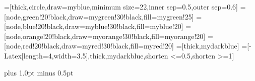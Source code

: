 \documentclass{report}
\begin{document}
\usepackage{xcolor}
=[thick,circle,draw=myblue,minimum size=22,inner sep=0.5,outer sep=0.6]
=[node,green!20!black,draw=mygreen!30!black,fill=mygreen!25]
=[node,blue!20!black,draw=myblue!30!black,fill=myblue!20]
=[node,orange!20!black,draw=myorange!30!black,fill=myorange!20]
=[node,red!20!black,draw=myred!30!black,fill=myred!20]
=[thick,mydarkblue] %
=[-{Latex[length=4,width=3.5]},thick,mydarkblue,shorten <=0.5,shorten >=1]
\def\nstyle{int(\lay<\Nnodlen?min(2,\lay):3)} %

\newlength\mybibindent
\setlength\mybibindent{0pt}
\makeatletter
\renewenvironment{thebibliography}[1]
    {\chapter*{\bibname}%
     \@mkboth{\MakeUppercase\bibname}{\MakeUppercase\bibname}%
     \list{\@biblabel{\@arabic\c@enumiv}}
          {\settowidth\labelwidth{\@biblabel{999}}
           \leftmargin\labelwidth
            \advance\leftmargin\dimexpr\labelsep+\mybibindent\relax\itemindent-\mybibindent
           \@openbib@code
           \usecounter{enumiv}
           \let\p@enumiv\@empty
           \renewcommand\theenumiv{\@arabic\c@enumiv}}
     \sloppy
     \clubpenalty4000
     \@clubpenalty \clubpenalty
     \widowpenalty4000%
     \sfcode`\.\@m}
    {\def\@noitemerr
      {\@latex@warning{Empty `thebibliography' environment}}
     \endlist}
\makeatother



\geometry{twoside, 
  paperheight = 24.0cm,
  paperwidth = 17.0cm,
  columnsep = 1.0cm,
  textheight = 19.0cm,
  textwidth = 12.8cm,
  centering,
  marginparwidth = 1cm,
  top = 3.0cm}

\parskip=0.5pt plus 1.0pt minus 0.5pt
\addtolength{\skip\footins}{1pt plus 5pt minus 1pt}
\end{document}
